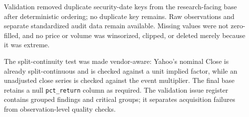 
Validation removed \DuplicateBaseKeys{} duplicate security-date keys from the research-facing base after deterministic ordering; no duplicate key remains. Raw observations and separate standardized audit data remain available. Missing values were not zero-filled, and no price or volume was winsorized, clipped, or deleted merely because it was extreme.

The split-continuity test was made vendor-aware: Yahoo's nominal Close is already split-continuous and is checked against a unit implied factor, while an unadjusted close series is checked against the event multiplier. The final base retains a null \texttt{pct\_return} column as required. The validation issue register contains \ValidationIssues{} grouped findings and \CriticalIssues{} critical groups; it separates acquisition failures from observation-level quality checks.
